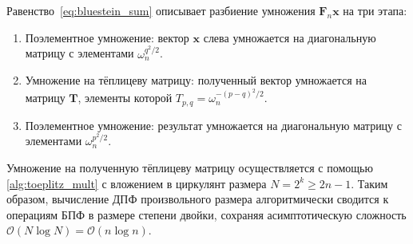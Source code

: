 \begin{tcbinsight}
    Равенство~\cref{eq:bluestein_sum} описывает разбиение умножения $\bm{F}_n \bm{x}$ на три этапа:
    \begin{enumerate}
        \item Поэлементное умножение: вектор $\bm{x}$ слева умножается на диагональную матрицу с элементами $\omega_n^{q^2/2}$.
        \item Умножение на тёплицеву матрицу: полученный вектор умножается на матрицу $\bm{T}$, элементы которой $T_{p,q} = \omega_n^{-(p-q)^2/2}$.
        \item Поэлементное умножение: результат умножается на диагональную матрицу с элементами $\omega_n^{p^2/2}$.
    \end{enumerate}
\end{tcbinsight}

Умножение на полученную тёплицеву матрицу осуществляется с помощью \cref{alg:toeplitz_mult} с вложением в циркулянт размера $N = 2^k \geq 2n-1$. Таким образом, вычисление ДПФ произвольного размера алгоритмически сводится к операциям БПФ в размере степени двойки, сохраняя асимптотическую сложность $\mathcal{O}(N \log N) = \mathcal{O}(n \log n)$.
